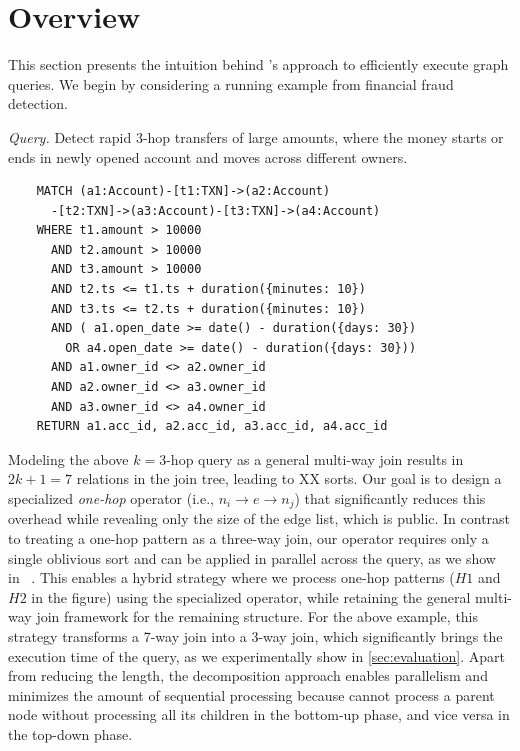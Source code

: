 \section{Overview}
\label{sec:overview}


This section presents the intuition behind \system's approach to efficiently execute graph
queries. We begin by considering a running example from financial fraud detection.

\noindent\textit{Query.} Detect rapid 3-hop transfers of large amounts, where the money starts or ends in newly opened account and moves across different owners.
\begin{verbatim}
    MATCH (a1:Account)-[t1:TXN]->(a2:Account)
      -[t2:TXN]->(a3:Account)-[t3:TXN]->(a4:Account)
    WHERE t1.amount > 10000
      AND t2.amount > 10000
      AND t3.amount > 10000
      AND t2.ts <= t1.ts + duration({minutes: 10})
      AND t3.ts <= t2.ts + duration({minutes: 10})
      AND ( a1.open_date >= date() - duration({days: 30})
        OR a4.open_date >= date() - duration({days: 30}))
      AND a1.owner_id <> a2.owner_id
      AND a2.owner_id <> a3.owner_id
      AND a3.owner_id <> a4.owner_id
    RETURN a1.acc_id, a2.acc_id, a3.acc_id, a4.acc_id
\end{verbatim}

Modeling the above $k=3$-hop query as a general multi-way join results
in $2k+1 = 7$ relations in the join tree, leading to XX sorts. 
Our goal is to design a specialized \emph{one-hop} operator (i.e., $n_i \rightarrow e
\rightarrow n_j$) that significantly reduces this overhead while revealing only the 
size of the edge list, which is public. In contrast to treating a one-hop pattern as a 
three-way join, our operator requires only a single oblivious sort and can be applied in
parallel across the query, as we show in ~. This enables
a hybrid strategy where we process one-hop patterns ($H1$ and $H2$ in the figure)
using the specialized operator, while retaining the general multi-way join framework for the
remaining structure. For the above example, this strategy transforms a 7-way join into
a 3-way join, which significantly brings the execution time of the query, as we experimentally
show in \cref{sec:evaluation}. Apart from reducing the length, the decomposition approach
enables parallelism and minimizes the amount of sequential processing because \wei cannot process a 
parent node without processing all its children in the bottom-up phase, and vice versa in the 
top-down phase.


